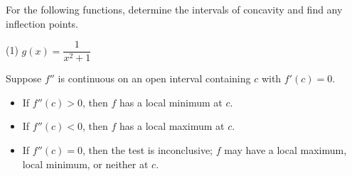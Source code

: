 \documentclass[../mathNotesPreamble]{subfiles}
\begin{document}
  \begin{ex*}
    For the following functions, determine the intervals of concavity and find any inflection points.
  \end{ex*}
  \pagebreak

  \begin{extasks}[after-item-skip=\stretch{1}](1)
    \task $g(x)=\dfrac{1}{x^2+1}$
  \end{extasks}
  \pagebreak

  \begin{thmBox*}
    Suppose $f''$ is continuous on an open interval containing $c$ with $f'(c)=0$.
    \begin{itemize}
      \item If $f''(c)>0$, then $f$ has a local minimum at $c$.
      \item If $f''(c)<0$, then $f$ has a local maximum at $c$.
      \item If $f''(c)=0$, then the test is inconclusive; $f$ may have a local maximum, local minimum, or neither at $c$.
    \end{itemize}
  \end{thmBox*}
  \pagebreak
\end{document}
